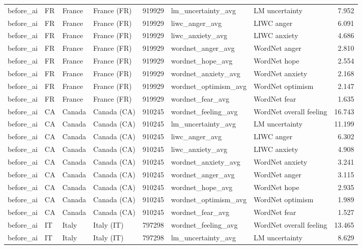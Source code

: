 \begin{tabular}{llllrllr}
before\_ai & FR & France & France (FR) & 919929 & lm\_uncertainty\_avg & LM uncertainty & 7.952 \\
before\_ai & FR & France & France (FR) & 919929 & liwc\_anger\_avg & LIWC anger & 6.091 \\
before\_ai & FR & France & France (FR) & 919929 & liwc\_anxiety\_avg & LIWC anxiety & 4.686 \\
before\_ai & FR & France & France (FR) & 919929 & wordnet\_anger\_avg & WordNet anger & 2.810 \\
before\_ai & FR & France & France (FR) & 919929 & wordnet\_hope\_avg & WordNet hope & 2.554 \\
before\_ai & FR & France & France (FR) & 919929 & wordnet\_anxiety\_avg & WordNet anxiety & 2.168 \\
before\_ai & FR & France & France (FR) & 919929 & wordnet\_optimism\_avg & WordNet optimism & 2.147 \\
before\_ai & FR & France & France (FR) & 919929 & wordnet\_fear\_avg & WordNet fear & 1.635 \\
before\_ai & CA & Canada & Canada (CA) & 910245 & wordnet\_feeling\_avg & WordNet overall feeling & 16.743 \\
before\_ai & CA & Canada & Canada (CA) & 910245 & lm\_uncertainty\_avg & LM uncertainty & 11.199 \\
before\_ai & CA & Canada & Canada (CA) & 910245 & liwc\_anger\_avg & LIWC anger & 6.302 \\
before\_ai & CA & Canada & Canada (CA) & 910245 & liwc\_anxiety\_avg & LIWC anxiety & 4.908 \\
before\_ai & CA & Canada & Canada (CA) & 910245 & wordnet\_anxiety\_avg & WordNet anxiety & 3.241 \\
before\_ai & CA & Canada & Canada (CA) & 910245 & wordnet\_anger\_avg & WordNet anger & 3.115 \\
before\_ai & CA & Canada & Canada (CA) & 910245 & wordnet\_hope\_avg & WordNet hope & 2.935 \\
before\_ai & CA & Canada & Canada (CA) & 910245 & wordnet\_optimism\_avg & WordNet optimism & 1.989 \\
before\_ai & CA & Canada & Canada (CA) & 910245 & wordnet\_fear\_avg & WordNet fear & 1.527 \\
before\_ai & IT & Italy & Italy (IT) & 797298 & wordnet\_feeling\_avg & WordNet overall feeling & 13.465 \\
before\_ai & IT & Italy & Italy (IT) & 797298 & lm\_uncertainty\_avg & LM uncertainty & 8.629 \\

\end{tabular}
